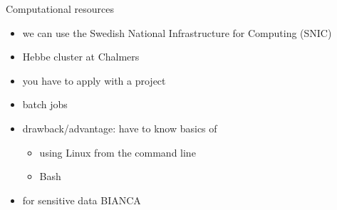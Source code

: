 \documentclass[xcolor=dvipsnames, handout]{beamer}
\begin{document}
\begin{frame}{Computational resources}
\begin{itemize}
  \item we can use the Swedish National Infrastructure for Computing (SNIC) 
  \item Hebbe cluster at Chalmers 
  \item you have to apply with a project
  \item batch jobs
  \item drawback/advantage: have to know basics of
  \begin{itemize}
    \item using Linux from the command line
    \item Bash
  \end{itemize}
  \item for sensitive data BIANCA
\end{itemize}
\end{frame}

\appendix
\end{document}

